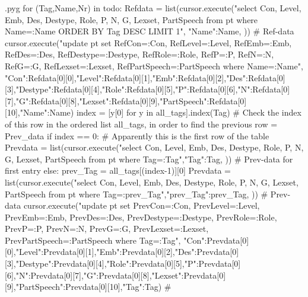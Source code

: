 \documentclass{report}
\makeatletter
\newenvironment{python}{%
  \VerbatimEnvironment
  \minted@resetoptions
  \setkeys{minted@opt}{}
      \begin{VerbatimOut}{\jobname.pyg}}
{%
      \end{VerbatimOut}
      \minted@pygmentize{python}
      \DeleteFile{\jobname.pyg}}
\makeatother
\begin{document}
\begin{python}
{{{for (Tag,Name,Nr) in todo:
    Refdata = list(cursor.execute("select Con, Level, Emb, Des, Destype, Role, P, N, G, Lexset, PartSpeech from pt where Name=:Name ORDER BY Tag DESC LIMIT 1", {"Name":Name, })) # Ref-data
    cursor.execute("update pt set RefCon=:Con, RefLevel=:Level, RefEmb=:Emb, RefDes=:Des, RefDestype=:Destype, RefRole=:Role, RefP=:P, RefN=:N, RefG=:G, RefLexset=:Lexset, RefPartSpeech=:PartSpeech where Name=:Name", {"Con":Refdata[0][0],"Level":Refdata[0][1],"Emb":Refdata[0][2],"Des":Refdata[0][3],"Destype":Refdata[0][4],"Role":Refdata[0][5],"P":Refdata[0][6],"N":Refdata[0][7],"G":Refdata[0][8],"Lexset":Refdata[0][9],"PartSpeech":Refdata[0][10],"Name":Name})
    index = [y[0] for y in all_tags].index(Tag)  # Check the index of this row in the ordered list all_tags, in order to find the previous row = Prev_data 
    if index == 0:  # Apparently this is the first row of the table
        Prevdata = list(cursor.execute("select Con, Level, Emb, Des, Destype, Role, P, N, G, Lexset, PartSpeech from pt where Tag=:Tag",{"Tag":Tag, })) # Prev-data for first entry
    else:
        prev_Tag = all_tags[(index-1)][0]
        Prevdata = list(cursor.execute("select Con, Level, Emb, Des, Destype, Role, P, N, G, Lexset, PartSpeech from pt where Tag=:prev_Tag",{"prev_Tag":prev_Tag, })) # Prev-data
    cursor.execute("update pt set PrevCon=:Con, PrevLevel=:Level, PrevEmb=:Emb, PrevDes=:Des, PrevDestype=:Destype, PrevRole=:Role, PrevP=:P, PrevN=:N, PrevG=:G, PrevLexset=:Lexset, PrevPartSpeech=:PartSpeech where Tag=:Tag", {"Con":Prevdata[0][0],"Level":Prevdata[0][1],"Emb":Prevdata[0][2],"Des":Prevdata[0][3],"Destype":Prevdata[0][4],"Role":Prevdata[0][5],"P":Prevdata[0][6],"N":Prevdata[0][7],"G":Prevdata[0][8],"Lexset":Prevdata[0][9],"PartSpeech":Prevdata[0][10],"Tag":Tag})
#}}}
\end{python}
\end{document}
